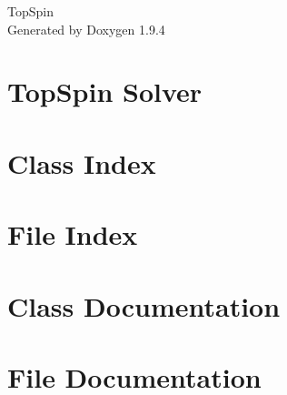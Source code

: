 \documentclass[twoside]{book}
\newcommand{\+}{\discretionary{\mbox{\scriptsize$\hookleftarrow$}}{}{}}
\newcommand{\clearemptydoublepage}{%
    \newpage{\pagestyle{empty}\cleardoublepage}%
  }
\begin{document}
  \raggedbottom
    \hypersetup{pageanchor=false,
                bookmarksnumbered=true,
                pdfencoding=unicode
               }
  \begin{titlepage}
  \vspace*{7cm}
  \begin{center}%
  {\Large Top\+Spin}\\
  \vspace*{1cm}
  {\large Generated by Doxygen 1.9.4}\\
  \end{center}
  \end{titlepage}
  \clearemptydoublepage
  \tableofcontents
  \clearemptydoublepage
  \hypersetup{pageanchor=true}
\chapter{Top\+Spin Solver}
\label{md_README}

\chapter{Class Index}

\chapter{File Index}

\chapter{Class Documentation}



\chapter{File Documentation}

  \backmatter
  \newpage
  \clearemptydoublepage
  \printindex
\end{document}
